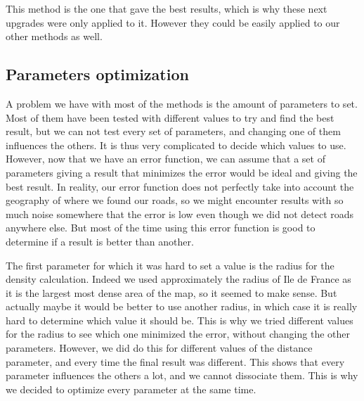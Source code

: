 \documentclass[main.tex]{subfiles}
\begin{document}
This method is the one that gave the best results, which is why these next upgrades were only applied to it. However they could be easily applied to our other methods as well.

\subsection{Parameters optimization}

A problem we have with most of the methods is the amount of parameters to set. Most of them have been tested with different values to try and find the best result, but we can not test every set of parameters, and changing one of them influences the others. It is thus very complicated to decide which values to use. However, now that we have an error function, we can assume that a set of parameters giving a result that minimizes the error would be ideal and giving the best result. In reality, our error function does not perfectly take into account the geography of where we found our roads, so we might encounter results with so much noise somewhere that the error is low even though we did not detect roads anywhere else. But most of the time using this error function is good to determine if a result is better than another. 

The first parameter for which it was hard to set a value is the radius for the density calculation. Indeed we used approximately the radius of Ile de France as it is the largest most dense area of the map, so it seemed to make sense. But actually maybe it would be better to use another radius, in which case it is really hard to determine which value it should be. This is why we tried different values for the radius to see which one minimized the error, without changing the other parameters. However, we did do this for different values of the distance parameter, and every time the final result was different. This shows that every parameter influences the others a lot, and we cannot dissociate them. This is why we decided to optimize every parameter at the same time.

\end{document}
